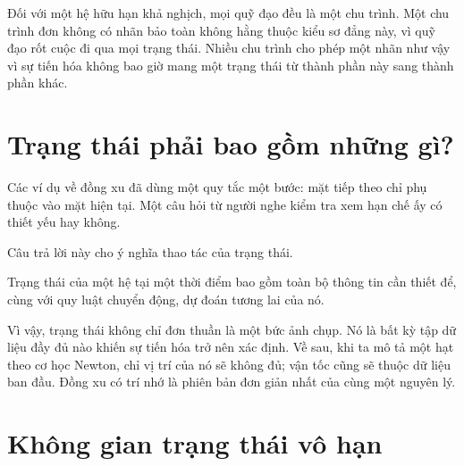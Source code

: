 Đối với một hệ hữu hạn khả nghịch, mọi quỹ đạo đều là một chu trình. Một chu trình đơn không có nhãn bảo toàn không hằng thuộc kiểu sơ đẳng này, vì quỹ đạo rốt cuộc đi qua mọi trạng thái. Nhiều chu trình cho phép một nhãn như vậy vì sự tiến hóa không bao giờ mang một trạng thái từ thành phần này sang thành phần khác.

\section{Trạng thái phải bao gồm những gì?}

Các ví dụ về đồng xu đã dùng một quy tắc một bước: mặt tiếp theo chỉ phụ thuộc vào mặt hiện tại. Một câu hỏi từ người nghe kiểm tra xem hạn chế ấy có thiết yếu hay không.

\begin{classroomqa}

\end{classroomqa}

Câu trả lời này cho ý nghĩa thao tác của trạng thái.

\begin{definition}
Trạng thái của một hệ tại một thời điểm bao gồm toàn bộ thông tin cần thiết để, cùng với quy luật chuyển động, dự đoán tương lai của nó.
\end{definition}

Vì vậy, trạng thái không chỉ đơn thuần là một bức ảnh chụp. Nó là bất kỳ tập dữ liệu đầy đủ nào khiến sự tiến hóa trở nên xác định. Về sau, khi ta mô tả một hạt theo cơ học Newton, chỉ vị trí của nó sẽ không đủ; vận tốc cũng sẽ thuộc dữ liệu ban đầu. Đồng xu có trí nhớ là phiên bản đơn giản nhất của cùng một nguyên lý.

\section{Không gian trạng thái vô hạn}

